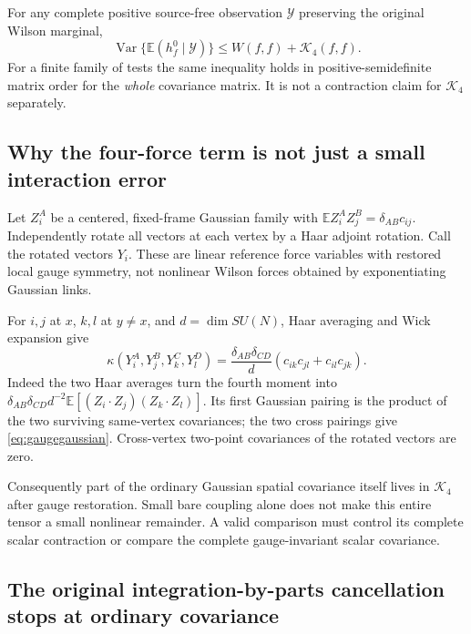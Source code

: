 \documentclass[11pt,letterpaper]{article}
\theoremstyle{remark}\newtheorem{remark}[theorem]{Remark}
\newcommand{\E}{\mathbb E}
\newcommand{\Var}{\operatorname{Var}}\newcommand{\Cov}{\operatorname{Cov}}
\newcommand{\cK}{\mathcal K}\newcommand{\cC}{\mathcal C}
\begin{document}
For any complete positive source-free observation \(\mathcal Y\) preserving the original Wilson marginal,
\begin{equation}\label{eq:actualprojection}
 \Var\{\E(h_f^0\mid\mathcal Y)\}
 \le W(f,f)+\cK_4(f,f).
\end{equation}
For a finite family of tests the same inequality holds in positive-semidefinite matrix order for the \emph{whole} covariance matrix. It is not a contraction claim for \(\cK_4\) separately.

\subsection{Why the four-force term is not just a small interaction error}

Let \(Z_i^A\) be a centered, fixed-frame Gaussian family with
\(\E Z_i^AZ_j^B=\delta_{AB}c_{ij}\). Independently rotate all vectors at each vertex by a Haar adjoint rotation. Call the rotated vectors \(Y_i\). These are linear reference force variables with restored local gauge symmetry, not nonlinear Wilson forces obtained by exponentiating Gaussian links.

For \(i,j\) at \(x\), \(k,l\) at \(y\ne x\), and \(d=\dim SU(N)\), Haar averaging and Wick expansion give
\begin{equation}\label{eq:gaugegaussian}
 \kappa(Y_i^A,Y_j^B,Y_k^C,Y_l^D)
 =\frac{\delta_{AB}\delta_{CD}}d
 (c_{ik}c_{jl}+c_{il}c_{jk}).
\end{equation}
Indeed the two Haar averages turn the fourth moment into
\(\delta_{AB}\delta_{CD}d^{-2}\E[(Z_i\cdot Z_j)(Z_k\cdot Z_l)]\). Its first Gaussian pairing is the product of the two surviving same-vertex covariances; the two cross pairings give \eqref{eq:gaugegaussian}. Cross-vertex two-point covariances of the rotated vectors are zero.

Consequently part of the ordinary Gaussian spatial covariance itself lives in \(\cK_4\) after gauge restoration. Small bare coupling alone does not make this entire tensor a small nonlinear remainder. A valid comparison must control its complete scalar contraction or compare the complete gauge-invariant scalar covariance.

\subsection{The original integration-by-parts cancellation stops at ordinary covariance}
\end{document}
